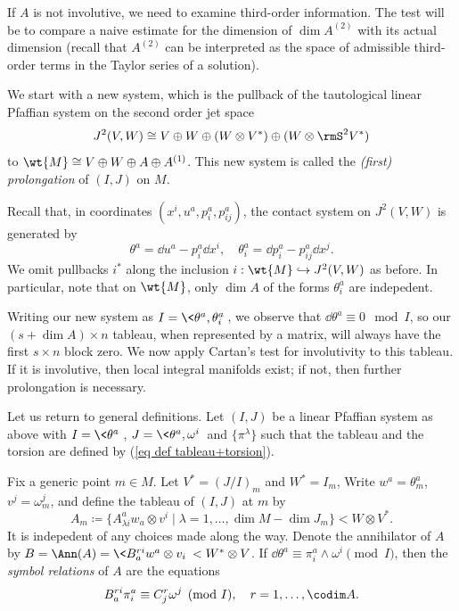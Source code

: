 \begin{example}
    If $A$ is not involutive, we need to examine third-order information. The test will be to compare a naive estimate for the dimension of $\dim A^{(2)}$ with its actual dimension (recall that $A^{(2)}$ can be interpreted as the space of admissible third-order terms in the Taylor series of a solution). 

    We start with a new system, which is the pullback of the tautological linear Pfaffian system on the second order jet space 
    \[J^2(V,W)\cong V\oplus W\oplus (W\otimes V^\ast)\oplus (W\otimes \rmS^2 V^\ast)\]
    to $\wt{M}\cong V\oplus W\oplus A\oplus A^{(1)}$. This new system is called the \emph{(first) prolongation} of $(I,J)$ on $M$.

    Recall that, in coordinates $(x^i,u^a,p^a_i,p^a_{ij})$, the contact system on $J^2(V,W)$ is generated by 
    \[\theta^a=\dd u^a-p^a_i\dd x^i,\quad \theta^a_i=\dd p^a_i-p^a_{ij}\dd x^j.\]
    We omit pullbacks $i^\ast$ along the inclusion $i:\wt{M}\hookrightarrow J^2(V,W)$ as before. In particular, note that on $\wt{M}$, only $\dim A$ of the forms $\theta^a_i$ are indepedent. 

    Writing our new system as $I=\<\theta^a,\theta^a_i\>$, we observe that $\dd\theta^a\equiv 0\mod{I}$, so our $(s+\dim A)\times n$ tableau, when represented by a matrix, will always have the first $s\times n$ block zero. We now apply Cartan's test for involutivity to this tableau. If it is involutive, then local integral manifolds exist; if not, then further prolongation is necessary.
\end{example}


Let us return to general definitions. Let $(I,J)$ be a linear Pfaffian system as above with $I=\<\theta^a\>$, $J=\<\theta^a,\omega^i\>$ and $\{\pi^\lambda\}$ such that the tableau and the torsion are defined by (\ref{eq def tableau+torsion}).

\begin{defn}
    Fix a generic point $m\in M$. Let $V^\ast=(J\slash I)_m$ and $W^\ast=I_m$, Write $w^a=\theta^a_m$, $v^j=\omega^j_m$, and define the tableau of $(I,J)$ at $m$ by 
    \[A_m\coloneqq \{A^a_{\lambda i} w_a\otimes v^i\mid \lambda=1,\ldots,\dim M-\dim J_m\}<W\otimes V^\ast.\]
    It is indepedent of any choices made along the way. Denote the annihilator of $A$ by $B=\Ann(A)=\<B^{ri}_a w^a\otimes v_i\>< W^\ast\otimes V$. If $\dd\theta^a\equiv \pi^a_i\wedge \omega^i\pmod{I}$, then the \emph{symbol relations} of $A$ are the equations
    \[B^{ri}_a\pi^a_i\equiv C^r_j \omega^j\pmod{I},\quad r=1,\ldots,\codim A.\]
\end{defn}

